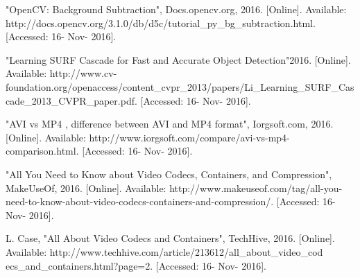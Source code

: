 \documentclass[onecolumn, draftclsnofoot,10pt, compsoc]{IEEEtran}
\begin{document}
\begin{thebibliography}{99}
"OpenCV: Background Subtraction", Docs.opencv.org, 2016. [Online]. Available: http://docs.opencv.org/3.1.0/db/d5c/tutorial\_py\_bg\_subtraction.html. [Accessed: 16- Nov- 2016].

"Learning SURF Cascade for Fast and Accurate Object Detection"2016. [Online]. Available: http://www.cv-foundation.org/openaccess/content\_cvpr\_2013/papers/Li\_Learning\_SURF\_Cascade\_2013\_CVPR\_paper.pdf. [Accessed: 16- Nov- 2016].

"AVI vs MP4 , difference between AVI and MP4 format", Iorgsoft.com, 2016. [Online]. Available: http://www.iorgsoft.com/compare/avi-vs-mp4-comparison.html. [Accessed: 16- Nov- 2016].

"All You Need to Know about Video Codecs, Containers, and Compression", MakeUseOf, 2016. [Online]. Available: http://www.makeuseof.com/tag/all-you-need-to-know-about-video-codecs-containers-and-compression/. [Accessed: 16- Nov- 2016].

L.  Case, "All About Video Codecs and Containers", TechHive, 2016. [Online]. Available: http://www.techhive.com/article/213612/all\_about\_video\_cod\\ecs\_and\_containers.html?page=2. [Accessed: 16- Nov- 2016].


\end{thebibliography}


%



\end{document}

